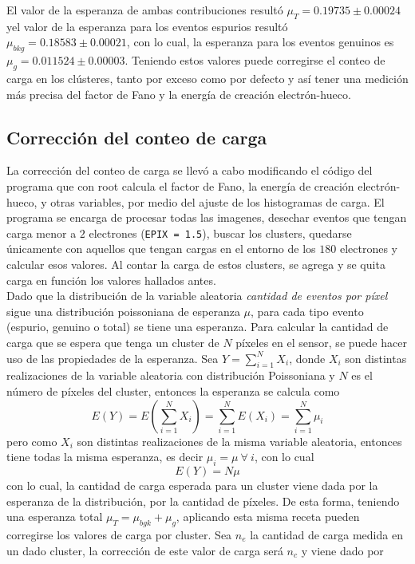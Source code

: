 \indent El valor de la esperanza de ambas contribuciones resultó $\mu_{T} = 0.19735 \pm 0.00024$ yel valor de la esperanza para los eventos espurios resultó $\mu_{bkg} = 0.18583 \pm 0.00021$, con lo cual, la esperanza para los eventos genuinos es $\mu_{g} = 0.011524 \pm 0.00003$. Teniendo estos valores puede corregirse el conteo de carga en los clústeres, tanto por exceso como por defecto y así tener una medición más precisa del factor de Fano y la energía de creación electrón-hueco.

\subsection{Corrección del conteo de carga}
\noindent La corrección del conteo de carga se llevó a cabo modificando el código del programa que con root calcula el factor de Fano, la energía de creación electrón-hueco, y otras variables, por medio del ajuste de los histogramas de carga. El programa se encarga de procesar todas las imagenes, desechar eventos que tengan carga menor a $2$ electrones (\verb|EPIX = 1.5|), buscar los clusters, quedarse únicamente con aquellos que tengan cargas en el entorno de los $180$ electrones y calcular esos valores. Al contar la carga de estos clusters, se agrega y se quita carga en función los valores hallados antes.\\
\indent Dado que la distribución de la variable aleatoria \textit{cantidad de eventos por píxel} sigue una distribución poissoniana de esperanza $\mu$, para cada tipo evento (espurio, genuino o total) se tiene una esperanza. Para calcular la cantidad de carga que se espera que tenga un cluster de $N$ píxeles en el sensor, se puede hacer uso de las propiedades de la esperanza. Sea $Y = \sum\limits_{i = 1}^{N} X_{i}$, donde $X_{i}$ son distintas realizaciones de la variable aleatoria con distribución Poissoniana y $N$ es el número de píxeles del cluster, entonces la esperanza se calcula como
\begin{equation*}
    E(Y) = 
    E
    \left(
        \sum\limits_{i=1}^{N} X_{i}
    \right)
    = \sum\limits_{i=1}^{N}E(X_{i})
    = \sum\limits_{i=1}^{N}\mu_{i}
\end{equation*}
pero como $X_{i}$ son distintas realizaciones de la misma variable aleatoria, entonces tiene todas la misma esperanza, es decir $\mu_{i} = \mu\ \forall\ i$, con lo cual
\begin{equation*}
    E(Y) = N\mu
\end{equation*}
con lo cual, la cantidad de carga esperada para un cluster viene dada por la esperanza de la distribución, por la cantidad de píxeles. De esta forma, teniendo una esperanza total $\mu_{T} = \mu_{bgk} + \mu_{g}$, aplicando esta misma receta pueden corregirse los valores de carga por cluster. Sea $n_{e}$ la cantidad de carga medida en un dado cluster, la corrección de este valor de carga será $n_{c}$ y viene dado por
